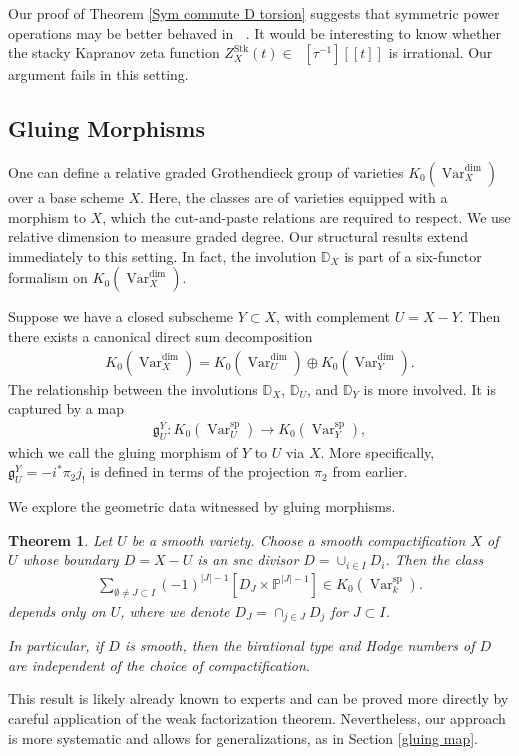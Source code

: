 \documentclass{amsart}
\newtheorem{thm}{Theorem}[section]
\theoremstyle{definition}
\DeclareMathOperator{\Var}{Var}
\DeclareMathOperator{\spr}{sp}
\DeclareMathOperator{\Stk}{Stk}
\newcommand{\Kspr}{K_0(\Var_k^{\spr})}
\DeclareMathOperator{\Kstk}{K_0(\Stk_k^{\dim})}
\numberwithin{equation}{section}
\begin{document}
Our proof of Theorem \ref{Sym commute D torsion} suggests that symmetric power operations may be better behaved in $\Kstk$. It would be interesting to know whether the stacky Kapranov zeta function $Z_X^{\Stk}(t) \in \Kstk[\tau^{-1}][[t]]$ is irrational. Our argument fails in this setting.



\subsection{Gluing Morphisms}
One can define a relative graded Grothendieck group of varieties $K_0(\Var_X^{\dim})$ over a base scheme $X$. Here, the classes are of varieties equipped with a morphism to $X$, which the cut-and-paste relations are required to respect. We use relative dimension to measure graded degree. Our structural results extend immediately to this setting. In fact, the involution $\mathbb{D}_X$ is part of a six-functor formalism on $K_0(\Var_{X}^{\dim})$.

Suppose we have a closed subscheme $Y \subset X$, with complement $U = X - Y$. Then there exists a canonical direct sum decomposition
\begin{align*}
    K_0(\Var_X^{\dim}) = K_0(\Var_U^{\dim}) \oplus K_0(\Var_Y^{\dim}).
\end{align*}
The relationship between the involutions $\mathbb{D}_X$, $\mathbb{D}_U$, and $\mathbb{D}_Y$ is more involved. It is captured by a map
\begin{align*}
    \mathfrak{g}_U^Y: K_0(\Var_U^{\spr}) \rightarrow K_0(\Var_Y^{\spr}),
\end{align*}
which we call the gluing morphism of $Y$ to $U$ via $X$. More specifically, $\mathfrak{g}_U^Y = -i^* \pi_2 j_!$ is defined in terms of the projection $\pi_2$ from earlier.

We explore the geometric data witnessed by gluing morphisms.

\begin{thm}\label{intro glue thm}
Let $U$ be a smooth variety. Choose a smooth compactification $X$ of $U$ whose boundary $D = X - U$ is an snc divisor $D = \cup_{i \in I} D_i$. Then the class
\begin{align*}
    \sum_{\emptyset \neq J \subset I} (-1)^{|J|-1} [D_J \times \mathbb{P}^{|J|-1}] \in \Kspr.
\end{align*}
depends only on $U$, where we denote $D_J = \cap_{j \in J} D_j$ for $J \subset I$.

In particular, if $D$ is smooth, then the birational type and Hodge numbers of $D$ are independent of the choice of compactification.
\end{thm}
This result is likely already known to experts and can be proved more directly by careful application of the weak factorization theorem. Nevertheless, our approach is more systematic and allows for generalizations, as in Section \ref{gluing map}.
\end{document}
